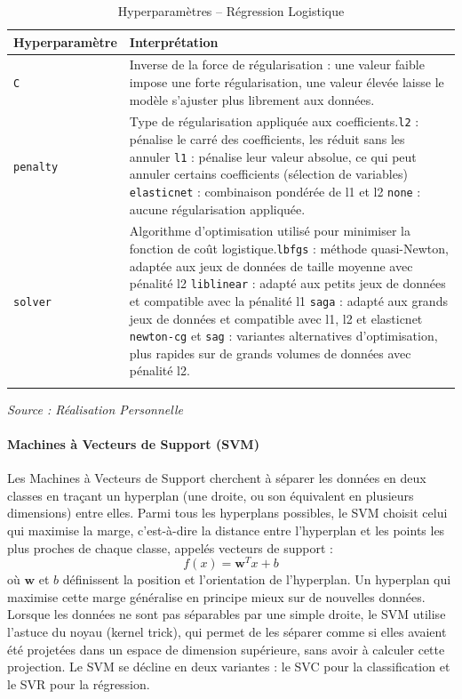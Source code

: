 \documentclass[a4paper,12pt, oneside]{article}
\begin{document}
\begin{longtable}{|m{5cm}|m{12cm}|}
\hline
\textbf{Hyperparamètre} & \textbf{Interprétation} \\
\hline
\texttt{C} & Inverse de la force de régularisation : une valeur faible impose une forte régularisation, une valeur élevée laisse le modèle s'ajuster plus librement aux données. \\
\hline
\texttt{penalty} & Type de régularisation appliquée aux coefficients.\newline\texttt{l2} : pénalise le carré des coefficients, les réduit sans les annuler \newline\texttt{l1} : pénalise leur valeur absolue, ce qui peut annuler certains coefficients (sélection de variables) \newline \texttt{elasticnet} : combinaison pondérée de l1 et l2 \newline \texttt{none} : aucune régularisation appliquée. \\
\hline
\texttt{solver} & Algorithme d'optimisation utilisé pour minimiser la fonction de coût logistique.\newline \texttt{lbfgs} : méthode quasi-Newton, adaptée aux jeux de données de taille moyenne avec pénalité l2 \newline \texttt{liblinear} : adapté aux petits jeux de données et compatible avec la pénalité l1 \newline \texttt{saga} : adapté aux grands jeux de données et compatible avec l1, l2 et elasticnet \newline \texttt{newton-cg} et \texttt{sag} : variantes alternatives d'optimisation, plus rapides sur de grands volumes de données avec pénalité l2. \\
\hline
\caption{Hyperparamètres -- Régression Logistique}
\end{longtable}
\begin{center}
\vspace{-0.85cm}
\textit{Source : Réalisation Personnelle}
\end{center}


\paragraph{Machines à Vecteurs de Support (SVM)\\}
Les Machines à Vecteurs de Support cherchent à séparer les données en deux classes en traçant un hyperplan (une droite, ou son équivalent en plusieurs dimensions) entre elles. Parmi tous les hyperplans possibles, le SVM choisit celui qui maximise la marge, c'est-à-dire la distance entre l'hyperplan et les points les plus proches de chaque classe, appelés vecteurs de support :
\[
f(x) = \mathbf{w}^T x + b
\]
où $\mathbf{w}$ et $b$ définissent la position et l'orientation de l'hyperplan. Un hyperplan qui maximise cette marge généralise en principe mieux sur de nouvelles données. Lorsque les données ne sont pas séparables par une simple droite, le SVM utilise l'astuce du noyau (kernel trick), qui permet de les séparer comme si elles avaient été projetées dans un espace de dimension supérieure, sans avoir à calculer cette projection. Le SVM se décline en deux variantes : le SVC pour la classification et le SVR pour la régression.
\end{document}
